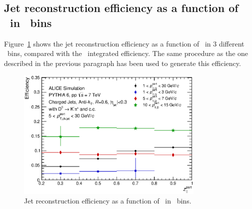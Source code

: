 \subsection{Jet reconstruction efficiency as a function of \zpargen\ in \ptdgen\ bins}
Figure~\ref{fig:D0_Full_R060_Efficiency_Z_Vs_DPt} shows the jet reconstruction efficiency as a function of \zpargen\ in 3 different \ptdgen\ bins,
compared with the \ptdgen\ integrated efficiency. The same procedure as the one described in the previous paragraph has been used to generate
this efficiency.
\begin{figure}[tbh]
\begin{center}
\includegraphics[width=0.8\textwidth]{img/D0_Full_R060_Efficiency_Z_Vs_DPt}
 \caption{Jet reconstruction efficiency as a function of \zpargen\ in \ptdgen\ bins.} 
 \label{fig:D0_Full_R060_Efficiency_Z_Vs_DPt}
\end{center}
\end{figure}
